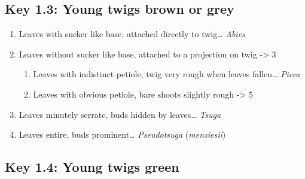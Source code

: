 \documentclass[openany]{book}
\providecommand{\tightlist}{%
  \setlength{\itemsep}{0pt}\setlength{\parskip}{0pt}}
\begin{document}
\hypertarget{key-1.3-young-twigs-brown-or-grey}{%
\subsection*{Key 1.3: Young twigs brown or
grey}\label{key-1.3-young-twigs-brown-or-grey}}

\begin{enumerate}
\def\labelenumi{\arabic{enumi}.}
\tightlist
\item
  Leaves with sucker like base, attached directly to twig\ldots{}
  \emph{Abies}
\item
  Leaves without sucker like base, attached to a projection on twig
  -\textgreater{} 3

  \begin{enumerate}
  \def\labelenumii{\arabic{enumii}.}
  \setcounter{enumii}{2}
  \tightlist
  \item
    Leaves with indistinct petiole, twig very rough when leaves
    fallen\ldots{} \emph{Picea}
  \item
    Leaves with obvious petiole, bare shoots slightly rough
    -\textgreater{} 5
  \end{enumerate}
\item
  Leaves minutely serrate, buds hidden by leaves\ldots{} \emph{Tsuga}
\item
  Leaves entire, buds prominent\ldots{} \emph{Pseudotsuga}
  (\emph{menziesii})
\end{enumerate}

\hypertarget{key-1.4-young-twigs-green}{%
\subsection*{Key 1.4: Young twigs
green}\label{key-1.4-young-twigs-green}}
\end{document}
